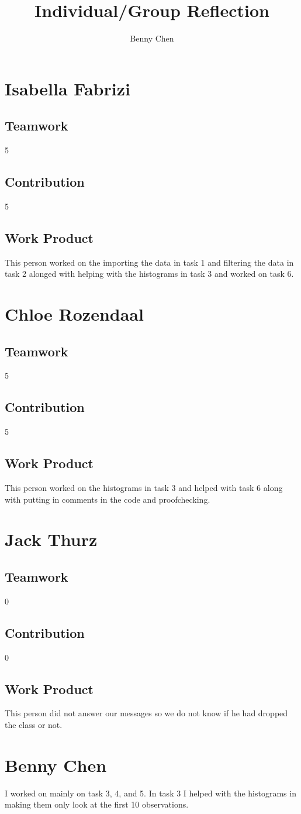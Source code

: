 \documentclass{article}
\title{Individual/Group Reflection}
\author{Benny Chen}
\date{}
\begin{document}
\maketitle

\section*{Isabella Fabrizi}
\subsection*{Teamwork}
5
\subsection*{Contribution}
5
\subsection*{Work Product}
This person worked on the importing the data in task 1 and filtering the data in task 2 alonged with helping with the histograms in task 3 and worked on task 6.

\section*{Chloe Rozendaal}
\subsection*{Teamwork}
5
\subsection*{Contribution}
5
\subsection*{Work Product}
This person worked on the histograms in task 3 and helped with task 6 along with putting in comments in the code and proofchecking.

\section*{Jack Thurz}
\subsection*{Teamwork}
0
\subsection*{Contribution}
0
\subsection*{Work Product}
This person did not answer our messages so we do not know if he had dropped the class or not.

\section*{Benny Chen}
I worked on mainly on task 3, 4, and 5. In task 3 I helped with the histograms in making them only look at the first 10 observations. 
\end{document}
